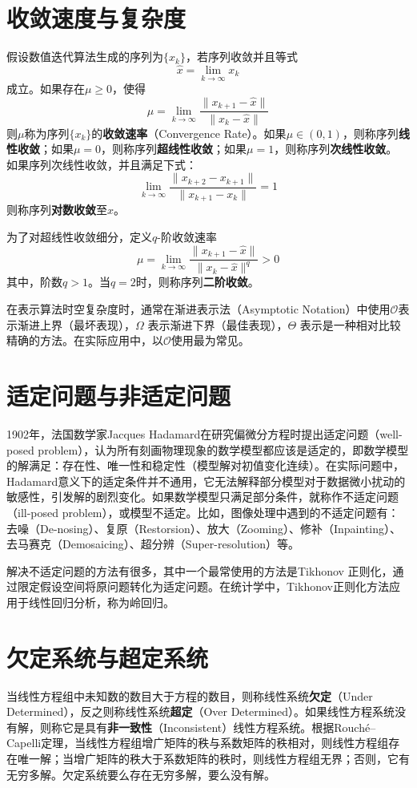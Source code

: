 \section{收敛速度与复杂度}
假设数值迭代算法生成的序列为$\{x_k\}$，若序列收敛并且等式
\begin{equation}
    \hat x = \lim\limits_{k\rightarrow \infty} x_k
\end{equation}
成立。如果存在$\mu\ge 0$，使得
\begin{equation}
    \mu = \lim\limits_{k\rightarrow \infty} \frac{\|x_{k+1} - \hat x\|}{\|x_k - \hat x\|}
\end{equation}
则$\mu$称为序列$\{x_k\}$的\textbf{收敛速率}（Convergence Rate）。如果$\mu\in(0,1)$，则称序列\textbf{线性收敛}；如果$\mu=0$，则称序列\textbf{超线性收敛}；如果$\mu=1$，则称序列\textbf{次线性收敛}。
如果序列次线性收敛，并且满足下式：
\begin{equation}
    \lim\limits_{k\rightarrow \infty} \frac{\|x_{k+2} - x_{k+1}\|}{\|x_{k+1}-x_k \|} = 1
\end{equation}
则称序列\textbf{对数收敛}至$\hat x$。

为了对超线性收敛细分，定义$q$-阶收敛速率
\begin{equation}
    \mu = \lim\limits_{k\rightarrow \infty} \frac{\|x_{k+1} - \hat x\|}{\|x_k - \hat x\|^q} >0
\end{equation}
其中，阶数$q>1$。当$q=2$时，则称序列\textbf{二阶收敛}。

在表示算法时空复杂度时，通常在渐进表示法（Asymptotic Notation）中使用$\mathcal O$表示渐进上界（最坏表现），$\Omega$ 表示渐进下界（最佳表现），$\Theta$ 表示是一种相对比较精确的方法。在实际应用中，以$\mathcal O$使用最为常见。

\section{适定问题与非适定问题}
1902年，法国数学家Jacques Hadamard\cite{hadamard1902problemes}在研究偏微分方程时提出适定问题（well-posed problem），认为所有刻画物理现象的数学模型都应该是适定的，即数学模型的解满足：存在性、唯一性和稳定性（模型解对初值变化连续）。在实际问题中，Hadamard意义下的适定条件并不通用，它无法解释部分模型对于数据微小扰动的敏感性，引发解的剧烈变化。如果数学模型只满足部分条件，就称作不适定问题（ill-posed problem），或模型不适定。比如，图像处理中遇到的不适定问题有：去噪（De-nosing）、复原（Restorsion）、放大（Zooming）、修补（Inpainting）、去马赛克（Demosaicing）、超分辨（Super-resolution）等。

解决不适定问题的方法有很多，其中一个最常使用的方法是Tikhonov 正则化，通过限定假设空间将原问题转化为适定问题。在统计学中，Tikhonov正则化方法应用于线性回归分析，称为岭回归。

\section{欠定系统与超定系统}
当线性方程组中未知数的数目大于方程的数目，则称线性系统\textbf{欠定}（Under Determined），反之则称线性系统\textbf{超定}（Over Determined）。如果线性方程系统没有解，则称它是具有\textbf{非一致性}（Inconsistent）线性方程系统。根据Rouch\'{e}–Capelli定理，当线性方程组增广矩阵的秩与系数矩阵的秩相对，则线性方程组存在唯一解；当增广矩阵的秩大于系数矩阵的秩时，则线性方程组无界；否则，它有无穷多解。欠定系统要么存在无穷多解，要么没有解。
